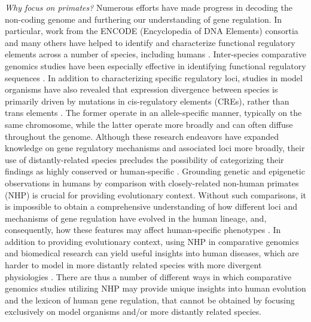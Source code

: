 {\textit{Why focus on primates?} Numerous efforts have made progress in decoding the non-coding genome and furthering our understanding of gene regulation. In particular, work from the ENCODE (Encyclopedia of DNA Elements) consortia and many others have helped to identify and characterize functional regulatory elements across a number of species, including humans \cite{Bernstein et al 2010 (The NIH Roadmap Epigenomics Mapping Consortium), ENCODE Project Consortium 2012 (An integrated...in the human genome), Mouse ENCODE Consortium 2012 (An encyclopedia of mouse DNA elements), Celniker et al. 2009 (Unlocking the secrets of the genome)}. Inter-species comparative genomics studies have been especially effective in identifying functional regulatory sequences \cite{Nobrega and Pennacchio 2004 (Comparative genomic analysis as a tool for biological discovery)}. In addition to characterizing specific regulatory loci, studies in model organisms have also revealed that expression divergence between species is primarily driven by mutations in cis-regulatory elements (CREs), rather than trans elements \cite{Tirosh and Barkai 2011 (Inferring regulatory mechanisms...)}. The former operate in an allele-specific manner, typically on the same chromosome, while the latter operate more broadly and can often diffuse throughout the genome. Although these research endeavors have expanded knowledge on gene regulatory mechanisms and associated loci more broadly, their use of distantly-related species precludes the possibility of categorizing their findings as highly conserved or human-specific \cite{Prime time for Primate Functional Genomics}. Grounding genetic and epigenetic observations in humans by comparison with closely-related non-human primates (NHP) is crucial for providing evolutionary context. Without such comparisons, it is impossible to obtain a comprehensive understanding of how different loci and mechanisms of gene regulation have evolved in the human lineage, and, consequently, how these features may affect human-specific phenotypes \cite{Romero, Ruvinsky, and Gilad 2012}. In addition to providing evolutionary context, using NHP in comparative genomics and biomedical research can yield useful insights into human diseases, which are harder to model in more distantly related species with more divergent physiologies \cite{Rogers and Gibbs 2014 (Comparative primate genomics: emerging patterns of genome content and dynamics)}. There are thus a number of different ways in which comparative genomics studies utilizing NHP may provide unique insights into human evolution and the lexicon of human gene regulation, that cannot be obtained by focusing exclusively on model organisms and/or more distantly related species.

}
